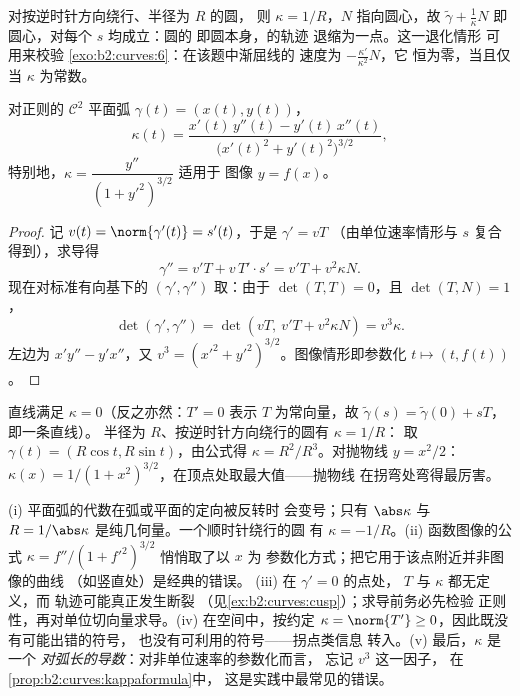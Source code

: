 \begin{example}\label{ex:b2:curves:circleevolute}
对按逆时针方向绕行、半径为 $R$ 的圆，
则 $\kappa = 1/R$，$N$ 指向圆心，故
 $\tilde\gamma + \frac1\kappa N$ 即
圆心，对每个 $s$ 均成立：圆的
即圆本身，的轨迹
退缩为一点。这一退化情形
可用来校验 \cref{exo:b2:curves:6}：在该题中渐屈线的
速度为 $-\frac{\kappa'}{\kappa^2}N$，它
恒为零，当且仅当 $\kappa$ 为常数。
\end{example}

\begin{proposition}\label{prop:b2:curves:kappaformula}
对正则的 $\mathcal{C}^2$ 平面弧 $\gamma(t) = (x(t), y(t))$，
\[
\kappa(t)
= \frac{x'(t)\,y''(t) - y'(t)\,x''(t)}
       {\bigl(x'(t)^2 + y'(t)^2\bigr)^{3/2}} ,
\]
特别地，$\kappa = \dfrac{y''}{(1 + y'^2)^{3/2}}$ 适用于
图像 $y = f(x)$。
\end{proposition}

\begin{proof}
记 $v(t) = \norm{\gamma'(t)} = s'(t)$，于是 $\gamma' = vT$
（由单位速率情形与 $s$ 复合得到），求导得
\[
\gamma'' = v'T + v\,T'\cdot s' = v'T + v^2\kappa N .
\]
现在对标准有向基下的
$(\gamma', \gamma'')$ 取：由于 $\det(T, T) = 0$，且 $\det(T, N) = 1$，
\[
\det(\gamma', \gamma'') = \det(vT,\ v'T + v^2\kappa N)
= v^3\kappa .
\]
左边为 $x'y'' - y'x''$，又 $v^3 = (x'^2 +
y'^2)^{3/2}$。图像情形即参数化 $t \mapsto (t,
f(t))$。
\end{proof}

\begin{example}[圆、直线、抛物线]\label{ex:b2:curves:kappaexamples}
直线满足 $\kappa = 0$（反之亦然：$T' = 0$ 表示 $T$
为常向量，故 $\tilde\gamma(s) = \tilde\gamma(0) + sT$，即一条直线）。
半径为 $R$、按逆时针方向绕行的圆有 $\kappa = 1/R$：
取 $\gamma(t) = (R\cos t, R\sin t)$，由公式得 $\kappa =
R^2/R^3$。对抛物线 $y = x^2/2$：$\kappa(x) = 1/(1 +
x^2)^{3/2}$，在顶点处取最大值——抛物线
在拐弯处弯得最厉害。
\end{example}

\begin{remark}[曲率的常见误区]
(i) 平面弧的代数在弧或平面的定向被反转时
会变号；只有 $\abs\kappa$ 与 $R = 1/\abs\kappa$
是纯几何量。一个顺时针绕行的圆
有 $\kappa = -1/R$。(ii) 函数图像的公式
$\kappa = f''/(1 + f'^2)^{3/2}$ 悄悄取了以 $x$ 为
参数化方式；把它用于该点附近并非图像的曲线
（如竖直处）是经典的错误。
(iii) 在 $\gamma' = 0$ 的点处，
$T$ 与 $\kappa$ 都无定义，而
轨迹可能真正发生断裂
（见\cref{ex:b2:curves:cusp}）；求导前务必先检验
正则性，再对单位切向量求导。(iv) 在空间中，按约定 $\kappa =
\norm{T'} \geq 0$，因此既没有可能出错的符号，
也没有可利用的符号——拐点类信息
转入。(v) 最后，$\kappa$ 是一个
\emph{对弧长的导数}：对非单位速率的参数化而言，
忘记 $v^3$ 这一因子，
在\cref{prop:b2:curves:kappaformula}中，
这是实践中最常见的错误。
\end{remark}

